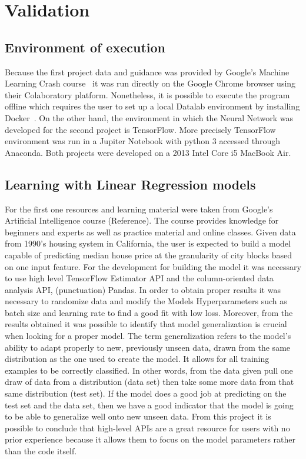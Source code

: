 

\section{Validation}
\label{sec:validation}



\subsection{Environment of execution}
Because the first project data and guidance was provided by Google's Machine Learning Crash course~\cite{mlchrome18}  it was run directly on the Google Chrome browser using their Colaboratory platform. Nonetheless, it is possible to execute the program offline which requires the user to set up a local Datalab environment by installing Docker~\cite{docker18}.   
On the other hand, the environment in which the Neural Network was developed for the second  project is TensorFlow. More precisely TensorFlow environment was run in a Jupiter Notebook with python 3 accessed through Anaconda. 
Both projects were developed on a 2013 Intel Core i5 MacBook Air.

\subsection{Learning with Linear Regression models}

For the first one resources and learning material were taken from Google’s Artificial Intelligence course (Reference).  The course provides knowledge for beginners and experts as well as practice material and online classes. Given data from 1990’s housing system in California, the user is expected to build a model capable of predicting median house price at the granularity of city blocks based on one input feature. For the development for building the model it was necessary to use high level TensorFlow Estimator API and the column-oriented data analysis API, (punctuation) Pandas.  In order to obtain proper results it was necessary to randomize data and modify the Models Hyperparameters such as batch size 
and learning rate to find a good fit with low loss. Moreover, from the results obtained it was possible to identify that model generalization is crucial when looking for a proper model. The term generalization refers to the model’s ability to adapt properly to new, previously unseen data, drawn from the same distribution as the one used to create the model.  It allows for all training examples to be correctly classified. In other words, from the data given pull one draw of data from a distribution (data set) then take some more data from that same distribution (test set). If the model does a good job at predicting on the test set and the data set, then we have a good indicator that the model is going to be able to generalize well onto new unseen data.  From this project it is possible to conclude that high-level APIs are a great resource for users with no prior experience because it allows them to focus on the model parameters rather than the code itself. 


